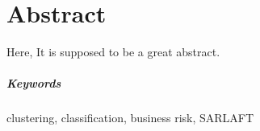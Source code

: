 \chapter{Abstract}
\label{chap:resumen}

Here, It is supposed to be a great abstract.

\vspace{1em}
\noindent
\paragraph*{Keywords} clustering, classification, business risk, SARLAFT

%
